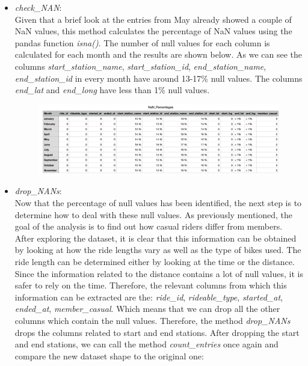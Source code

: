 \documentclass[12pt]{article}
\begin{document}
\begin{itemize}
	\item \textit{check\_NAN}:\\
	Given that a brief look at the entries from May already showed a couple of NaN values, this method calculates the percentage of NaN values using the pandas function \textit{isna()}. The number of null values for each column is calculated for each month and the results are shown below. As we can see the columns \textit{start\_station\_name}, \textit{start\_station\_id}, \textit{end\_station\_name}, \textit{end\_station\_id} in every month have around 13-17\% null values. The columns \textit{end\_lat} and \textit{end\_long} have less than 1\% null values. 
	\begin{figure}[ht]
	\includegraphics[width=6.5 in, height = 2 in]{imgNAN.png}
	\end{figure}
	
	\item \textit{drop\_NANs}:\\
	Now that the percentage of null values has been identified, the next step is to determine how to deal with these null values. As previously mentioned, the goal of the analysis is to find out how casual riders differ from members. After exploring the dataset, it is clear that this information can be obtained by looking at how the ride lengths vary as well as the type of bikes used. The ride length can be determined either by looking at the time or the distance. Since the information related to the distance contains a lot of null values, it is safer to rely on the time. Therefore, the relevant columns from which this information can be extracted are the: \textit{ride\_id}, \textit{rideable\_type}, \textit{started\_at}, \textit{ended\_at}, \textit{member\_casual}. Which means that we can drop all the other columns which contain the null values. Therefore, the method \textit{drop\_NANs} drops the columns related to start and end stations. After dropping the start and end stations, we can call the method \textit{count\_entries} once again and compare the new dataset shape to the original one:
	

\end{itemize}
\end{document}
